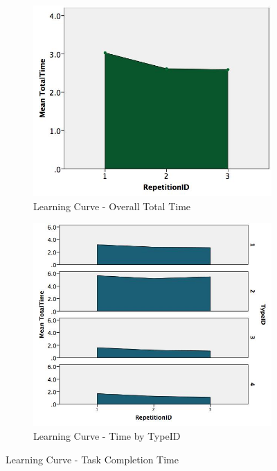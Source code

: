 \begin{figure}[H]
\centering
\begin{subfigure}[b]{0.45\textwidth}
    \centering
    \includegraphics[width=\textwidth]{figures/learningCurveTotal}
    \caption{Learning Curve - Overall Total Time }
    \label{fig:learningCurveTotal}
\end{subfigure}
\hfill
\begin{subfigure}[b]{0.45\textwidth}
    \centering
    \includegraphics[width=\textwidth]{figures/learningCurve}
    \caption{Learning Curve - Time by TypeID}
    \label{fig:learningCurve}
\end{subfigure}
\caption{ Learning Curve - Task Completion Time}
\label{fig:learningCurveTotalTime}
\end{figure}



